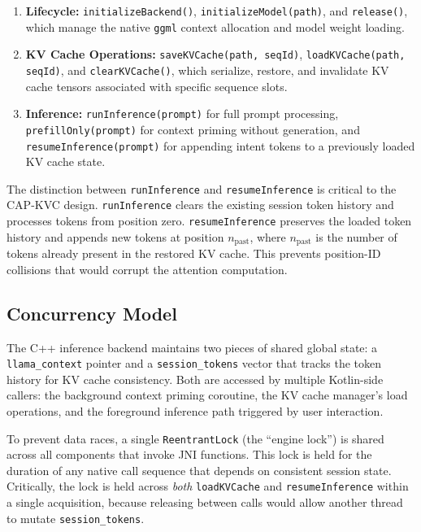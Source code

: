 \documentclass[journal]{IEEEtran}
\begin{document}
\begin{enumerate}
    \item \textbf{Lifecycle:} \texttt{initializeBackend()}, \texttt{initializeModel(path)}, and \texttt{release()}, which manage the native \texttt{ggml} context allocation and model weight loading.

    \item \textbf{KV Cache Operations:} \texttt{saveKVCache(path, seqId)}, \texttt{loadKVCache(path, seqId)}, and \texttt{clearKVCache()}, which serialize, restore, and invalidate KV cache tensors associated with specific sequence slots.

    \item \textbf{Inference:} \texttt{runInference(prompt)} for full prompt processing, \texttt{prefillOnly(prompt)} for context priming without generation, and \texttt{resumeInference(prompt)} for appending intent tokens to a previously loaded KV cache state.
\end{enumerate}

The distinction between \texttt{runInference} and \texttt{resumeInference} is critical to the CAP-KVC design. \texttt{runInference} clears the existing session token history and processes tokens from position zero. \texttt{resumeInference} preserves the loaded token history and appends new tokens at position $n_{\text{past}}$, where $n_{\text{past}}$ is the number of tokens already present in the restored KV cache. This prevents position-ID collisions that would corrupt the attention computation.

\subsection{Concurrency Model}
\label{sec:concurrency}

The C++ inference backend maintains two pieces of shared global state: a \texttt{llama\_context} pointer and a \texttt{session\_tokens} vector that tracks the token history for KV cache consistency. Both are accessed by multiple Kotlin-side callers: the background context priming coroutine, the KV cache manager's load operations, and the foreground inference path triggered by user interaction.

To prevent data races, a single \texttt{ReentrantLock} (the ``engine lock'') is shared across all components that invoke JNI functions. This lock is held for the duration of any native call sequence that depends on consistent session state. Critically, the lock is held across \emph{both} \texttt{loadKVCache} and \texttt{resumeInference} within a single acquisition, because releasing between calls would allow another thread to mutate \texttt{session\_tokens}.
\end{document}

